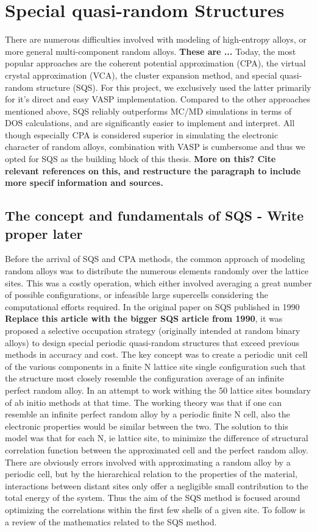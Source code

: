 \chapter{Special quasi-random Structures}
\label{sec:SQS}

There are numerous difficulties involved with modeling of high-entropy alloys, or more general multi-component random alloys. \textbf{These are ...} Today, the most popular approaches are the coherent potential approximation (CPA), the virtual crystal approximation (VCA), the cluster expansion method, and special quasi-random structure (SQS). For this project, we exclusively used the latter primarily for it's direct and easy VASP implementation. Compared to the other approaches mentioned above, SQS reliably outperforms MC/MD simulations in terms of DOS calculations, and are significantly easier to implement and interpret. All though especially CPA is considered superior in simulating the electronic character of random alloys, combination with VASP is cumbersome and thus we opted for SQS as the building block of this thesis. \textbf{More on this? Cite relevant references on this, and restructure the paragraph to include more specif information and sources.} 

\section{The concept and fundamentals of SQS - Write proper later}
Before the arrival of SQS and CPA methods, the common approach of modeling random alloys was to distribute the numerous elements randomly over the lattice sites. This was a costly operation, which either involved averaging a great number of possible configurations, or infeasible large supercells considering the computational efforts required. In the original paper on SQS published in 1990 \cite{sqsfull} \textbf{Replace this article with the bigger SQS article from 1990}, it was proposed a selective occupation strategy (originally intended at random binary alloys) to design special periodic quasi-random structures that exceed previous methods in accuracy and cost. The key concept was to create a periodic unit cell of the various components in a finite N lattice site single configuration such that the structure most closely resemble the configuration average of an infinite perfect random alloy. In an attempt to work withing the 50 lattice sites boundary of ab initio methods at that time. The working theory was that if one can resemble an infinite perfect random alloy by a periodic finite N cell, also the electronic properties would be similar between the two. The solution to this model was that for each N, ie lattice site, to minimize the difference of structural correlation function between the approximated cell and the perfect random alloy. There are obviously errors involved with approximating a random alloy by a periodic cell, but by the hierarchical relation to the properties of the material, interactions between distant sites only offer a negligible small contribution to the total energy of the system. Thus the aim of the SQS method is focused around optimizing the correlations within the first few shells of a given site. To follow is a review of the mathematics related to the SQS method.

